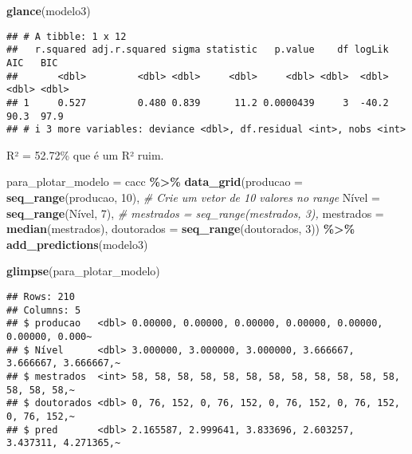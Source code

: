 \documentclass[
]{article}
\newenvironment{Shaded}{\begin{snugshade}}{\end{snugshade}}
\newcommand{\AttributeTok}[1]{\textcolor[rgb]{0.13,0.29,0.53}{#1}}
\newcommand{\CommentTok}[1]{\textcolor[rgb]{0.56,0.35,0.01}{\textit{#1}}}
\newcommand{\DecValTok}[1]{\textcolor[rgb]{0.00,0.00,0.81}{#1}}
\newcommand{\FunctionTok}[1]{\textcolor[rgb]{0.13,0.29,0.53}{\textbf{#1}}}
\newcommand{\NormalTok}[1]{#1}
\newcommand{\OtherTok}[1]{\textcolor[rgb]{0.56,0.35,0.01}{#1}}
\newcommand{\SpecialCharTok}[1]{\textcolor[rgb]{0.81,0.36,0.00}{\textbf{#1}}}
\begin{document}
\begin{Shaded}
\begin{Highlighting}[]
\FunctionTok{glance}\NormalTok{(modelo3)}
\end{Highlighting}
\end{Shaded}

\begin{verbatim}
## # A tibble: 1 x 12
##   r.squared adj.r.squared sigma statistic   p.value    df logLik   AIC   BIC
##       <dbl>         <dbl> <dbl>     <dbl>     <dbl> <dbl>  <dbl> <dbl> <dbl>
## 1     0.527         0.480 0.839      11.2 0.0000439     3  -40.2  90.3  97.9
## # i 3 more variables: deviance <dbl>, df.residual <int>, nobs <int>
\end{verbatim}

R² = 52.72\% que é um R² ruim.

\begin{Shaded}
\begin{Highlighting}[]
\NormalTok{para\_plotar\_modelo }\OtherTok{=}\NormalTok{ cacc }\SpecialCharTok{\%\textgreater{}\%} 
  \FunctionTok{data\_grid}\NormalTok{(}\AttributeTok{producao =} \FunctionTok{seq\_range}\NormalTok{(producao, }\DecValTok{10}\NormalTok{), }\CommentTok{\# Crie um vetor de 10 valores no range}
\NormalTok{            Nível }\OtherTok{=} \FunctionTok{seq\_range}\NormalTok{(Nível, }\DecValTok{7}\NormalTok{),  }
            \CommentTok{\# mestrados = seq\_range(mestrados, 3),}
            \AttributeTok{mestrados =} \FunctionTok{median}\NormalTok{(mestrados),}
            \AttributeTok{doutorados =} \FunctionTok{seq\_range}\NormalTok{(doutorados, }\DecValTok{3}\NormalTok{)) }\SpecialCharTok{\%\textgreater{}\%} 
  \FunctionTok{add\_predictions}\NormalTok{(modelo3)}

\FunctionTok{glimpse}\NormalTok{(para\_plotar\_modelo)}
\end{Highlighting}
\end{Shaded}

\begin{verbatim}
## Rows: 210
## Columns: 5
## $ producao   <dbl> 0.00000, 0.00000, 0.00000, 0.00000, 0.00000, 0.00000, 0.000~
## $ Nível      <dbl> 3.000000, 3.000000, 3.000000, 3.666667, 3.666667, 3.666667,~
## $ mestrados  <int> 58, 58, 58, 58, 58, 58, 58, 58, 58, 58, 58, 58, 58, 58, 58,~
## $ doutorados <dbl> 0, 76, 152, 0, 76, 152, 0, 76, 152, 0, 76, 152, 0, 76, 152,~
## $ pred       <dbl> 2.165587, 2.999641, 3.833696, 2.603257, 3.437311, 4.271365,~
\end{verbatim}
\end{document}
